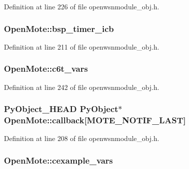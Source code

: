 Definition at line 226 of file openwsnmodule\+\_\+obj.\+h.

\subsubsection[{\texorpdfstring{bsp\+\_\+timer\+\_\+icb}{bsp_timer_icb}}]{ Open\+Mote\+::bsp\+\_\+timer\+\_\+icb}\hypertarget{struct_open_mote_aec0c6f65a74467f57a4068531efd2bfb}{}\label{struct_open_mote_aec0c6f65a74467f57a4068531efd2bfb}


Definition at line 211 of file openwsnmodule\+\_\+obj.\+h.

\subsubsection[{\texorpdfstring{c6t\+\_\+vars}{c6t_vars}}]{ Open\+Mote\+::c6t\+\_\+vars}\hypertarget{struct_open_mote_aafb440c974a45fce8dce5a1bcfbe8360}{}\label{struct_open_mote_aafb440c974a45fce8dce5a1bcfbe8360}


Definition at line 242 of file openwsnmodule\+\_\+obj.\+h.

\subsubsection[{\texorpdfstring{callback}{callback}}]{\setlength{\rightskip}{0pt plus 5cm}Py\+Object\+\_\+\+H\+E\+AD Py\+Object$\ast$ Open\+Mote\+::callback\mbox{[}{\bf M\+O\+T\+E\+\_\+\+N\+O\+T\+I\+F\+\_\+\+L\+A\+ST}\mbox{]}}\hypertarget{struct_open_mote_a960808a339e5da997df2ccf44cf33c40}{}\label{struct_open_mote_a960808a339e5da997df2ccf44cf33c40}


Definition at line 208 of file openwsnmodule\+\_\+obj.\+h.

\subsubsection[{\texorpdfstring{cexample\+\_\+vars}{cexample_vars}}]{ Open\+Mote\+::cexample\+\_\+vars}\hypertarget{struct_open_mote_a2601bf500d6585a238281c665c0eecee}{}\label{struct_open_mote_a2601bf500d6585a238281c665c0eecee}


